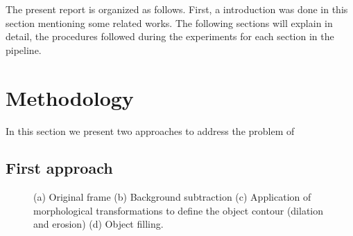 \documentclass[]{IEEEtran}
\begin{document}
The present report is organized as follows. First, a introduction was done in this section mentioning some related works. The following sections will explain in detail, the procedures followed during the experiments for each section in the pipeline.

\section{Methodology}
\label{sec:methodology}

In this section we present two approaches to address the problem of 

\subsection{First approach}
\label{sec:first_approach}

\begin{figure}[!ht]
  \centering
  \hspace{1mm}
  \hspace{1mm}
  \break
  \hspace{1mm}
  \hspace{1mm}
  \caption{(a) Original frame (b) Background subtraction (c) Application of morphological transformations to define the object contour (dilation and erosion) (d) Object filling.}
  \label{fig:gmx}
\end{figure}
\end{document}
